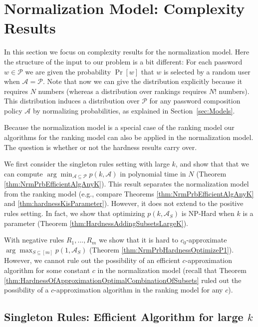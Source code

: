 \documentclass[prodmode,acmec]{ec-acmsmall}
\newcommand{\PasswordSpace}{\mathcal{P}}
\begin{document}
  
\section{Normalization Model: Complexity Results} \label{sec:NormalizedProbabilities}

In this section we focus on complexity results for the normalization model. Here the structure of the input to our problem is a bit different: For each password $w\in\PasswordSpace$ we are given the probability $\Pr[w]$ that $w$ is selected by a random user when $\mathcal{A}=\PasswordSpace$. Note that now we can give the distribution explicitly because it requires $N$ numbers (whereas a distribution over rankings requires $N!$ numbers). This distribution induces a distribution over $\PasswordSpace$ for any password composition policy $\mathcal{A}$ by normalizing probabilities, as explained in Section~\ref{sec:Models}.

Because the normalization model is a special case of the ranking model our algorithms for the ranking model can also be applied in the normalization model. The question is whether or not the hardness results carry over.  



We first consider the singleton rules setting with large $k$, and show that that we can compute $\arg\min_{\mathcal{A} \subseteq \mathcal{P}} p\left(k,\mathcal{A}\right)$ in polynomial time in $N$ (Theorem \ref{thm:NrmPrbEfficientAlgAnyK}). This result separates the normalization model from the ranking model (e.g., compare Theorems \ref{thm:NrmPrbEfficientAlgAnyK} and \ref{thm:hardnessKisParameter}). However, it does not extend to the positive rules setting. In fact, we show that optimizing $p\left(k,\mathcal{A}_S\right)$ is NP-Hard when $k$ is a parameter (Theorem \ref{thm:HardnessAddingSubsetsLargeK}).

With negative rules $R_1,...,R_m$ we show that it is hard to $c_0$-approximate  $\arg\max_{S \subseteq [m]} p\left(1,\mathcal{A}_S\right)$ (Theorem \ref{thm:NrmPrbHardnessOptimizeP1}). However, we cannot rule out the possibility of an efficient $c$-approximation algorithm for some constant $c$ in the normalization model (recall that Theorem \ref{thm:HardnessOfApproximationOptimalCombinationOfSubsets} ruled out the possibility of a $c$-approximation algorithm in the ranking model for any $c$).



\subsection{Singleton Rules: Efficient Algorithm for large $k$}
\label{subsec:PolyAlgForAnyKNormalizedProbabilities}
\end{document}
